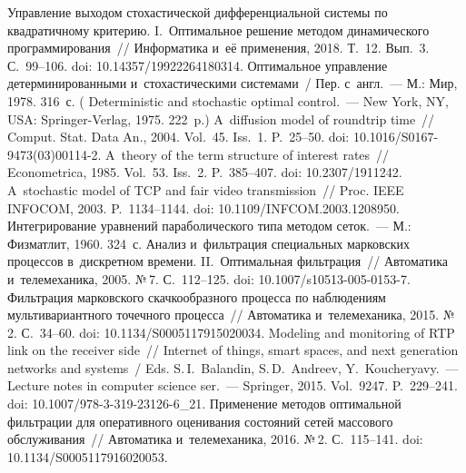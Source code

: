 \begin{multicols}{2}
{\small\frenchspacing
 {%
 \begin{thebibliography}{99}
 Управление выходом 
стохастической дифференциальной системы по квад\-ра\-тич\-но\-му критерию. 
I.~Оптимальное решение методом динамического программирования~// 
Информатика и~её применения, 2018. Т.~12. Вып.~3. С.~99--106. doi: 
10.14357/19922264180314.
 Оптимальное управление 
детерминированными и~стохастическими системами~/ Пер. с~англ.~--- М.: 
Мир, 1978. 316~с. ( Deterministic and 
stochastic optimal control.~--- New York, NY, USA: Springer-Verlag, 1975. 
222~p.)
 A~diffusion model of roundtrip time~// 
Comput. Stat. Data An., 2004. Vol.~45. Iss.~1. P.~25--50. 
doi: 10.1016/S0167-9473(03)00114-2.
 A~theory of the term structure of 
interest rates~// Econometrica, 1985. Vol.~53. Iss.~2. P.~385--407. doi: 
10.2307/1911242.
 A~stochastic model of TCP and fair video transmission~// 
Proc. IEEE INFOCOM, 2003. P.~1134--1144. doi: 
10.1109/INFCOM.2003.1208950.
 Интегрирование уравнений параболического типа 
методом сеток.~--- М.: Физматлит, 1960. 324~с.
Анализ и~фильтрация специальных марковских процессов в~дискретном 
времени. II.~Оптимальная фильтрация~// Автоматика и~телемеханика, 
2005. №\,7. С.~112--125. doi: 10.1007/s10513-005-0153-7.
 Фильт\-ра\-ция 
марковского скачкообразного процесса по наблюдениям 
мультивариантного точечного процесса~// Автоматика и~телемеханика, 
2015. №\,2. С.~34--60. doi: 10.1134/S0005117915020034.
 Modeling and monitoring of RTP link on 
the receiver side~// Internet of things, smart spaces, and next generation
networks and systems~/ Eds. S.\,I.~Balandin, S.\,D.~Andreev,
Y.~Koucheryavy.~--- Lecture notes in computer science ser.~--- Springer, 2015. Vol.~9247. 
P.~229--241. doi: 10.1007/978-3-319-23126-6\_21.
 Применение методов оптимальной фильтрации для 
оперативного оценивания состояний сетей массового обслуживания~// 
Автоматика и~телемеханика, 2016. №\,2. С.~115--141. doi: 
10.1134/S0005117916020053.
 \end{thebibliography}

 }
 }

\end{multicols}

